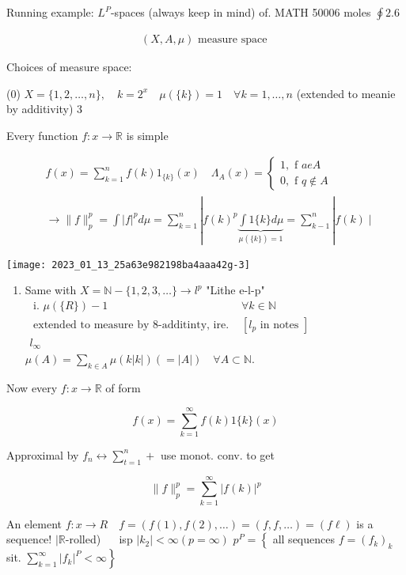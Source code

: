 \documentclass[10pt]{article}
\begin{document}
Running example: $L^{P}$-spaces (always keep in mind) of. MATH 50006 moles $\oint 2.6$

$$
\begin{aligned}
(X, A, \mu) \text { measure space }
\end{aligned}
$$

Choices of measure space:

(0) $X=\{1,2, \ldots, n\}, \quad k=2^{x} \quad \mu(\{k\})=1 \quad \forall k=1, \ldots, n$ (extended to meanie by additivity) 3

Every function $f: x \rightarrow \mathbb{R}$ is simple

$$
\begin{aligned}
& f(x)=\sum_{k=1}^{n} f(k) 1_{\{k\}}(x) \quad \Lambda_{A}(x)=\left\{\begin{array}{l}1, \text { f } a e A \\0, \text { f } q \notin A\end{array}\right. \\
& \rightarrow\|f\|_{p}^{p}=\int|f|^{p} d \mu=\sum_{k=1}^{n}|f(k)^{p} \underbrace{\int 1\{k\} d \mu}_{\mu(\{k\})=1}=\sum_{k-1}^{n}| f(k) \mid
\end{aligned}
$$

\begin{center}
\texttt{[image: 2023\_01\_13\_25a63e982198ba4aaa42g-3]}
\end{center}

\begin{enumerate}
  \item Same with $X=\mathbb{N}-\{1,2,3, \ldots\} \rightarrow l^{p}$ "Lithe e-l-p" $\begin{array}{lll}\text { i. } \mu(\{R\})-1 & \forall k \in \mathbb{N} & \\ \text { extended to measure by } 8 \text {-additinty, ire. } & {\left[l_{p} \text { in notes }\right]} \\ l_{\infty}\end{array}$ $\mu(A)=\sum_{k \in A} \mu(k|k|)(=|A|) \quad \forall A \subset \mathbb{N}$.
\end{enumerate}

Now every $f: x \rightarrow \mathbb{R}$ of form

$$
f(x)=\sum_{k=1}^{\infty} f(k) 1\{k\}(x)
$$

Approximal by $f_{n} \leftrightarrow \sum_{t=1}^{n}+$ use monot. conv. to get

$$
\|f\|_{p}^{p}=\sum_{k=1}^{\infty}|f(k)|^{p}
$$

An element $f: x \rightarrow R \quad f=(f(1), f(2), \ldots)=(f, f, \ldots)=(f \ell)$ is a sequence! $\mid \mathbb{R}$-rolled) $\quad$ isp $\left|k_{2}\right|<\infty(p=\infty)$ $p^{P}=\left\{\right.$ all sequences $f=\left(f_{k}\right)_{k}$ sit. $\left.\sum_{k=1}^{\infty}\left|f_{k}\right|^{P}<\infty\right\}$
\end{document}
